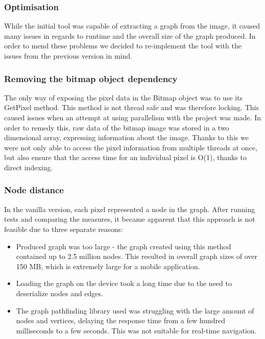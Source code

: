 \documentclass[12pt,a4paper]{report}
\begin{document}
\subsubsection{Optimisation}
While the initial tool was capable of extracting a graph from the image, it caused many issues in regards to runtime and the overall size of the graph produced. In order to mend these problems we decided to re-implement the tool with the issues from the previous version in mind. 

\subsubsection{Removing the bitmap object dependency}

The only way of exposing the pixel data in the Bitmap object was to use its GetPixel method. This method is not thread safe and was therefore locking. This caused issues when an attempt at using parallelism with the project was made. In order to remedy this, raw data of the bitmap image was stored in a two dimensional array, expressing information about the image. Thanks to this we were not only able to access the pixel information from multiple threads at once, but also ensure that the access time for an individual pixel is O(1), thanks to direct indexing. 

\subsubsection{Node distance}
In the vanilla version, each pixel represented a node in the graph. After running tests and comparing the measures, it became apparent that this approach is not feasible due to three separate reasons:
	
\begin{itemize}

\item Produced graph was too large - the graph created using this method contained up to 2.5 million nodes. This resulted in overall graph sizes of over 150 MB, which is extremely large for a mobile application.

\item Loading the graph on the device took a long time due to the need to deserialize nodes and edges.

\item The graph pathfinding library used was struggling with the large amount of nodes and vertices, delaying the response time from a few hundred milliseconds to a few seconds. This was not suitable for real-time navigation.

\end{itemize}
	
\end{document}
